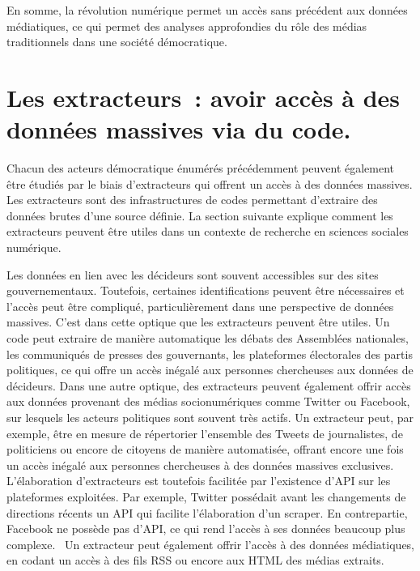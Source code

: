\documentclass[
  letterpaper,
]{scrbook}
\begin{document}
En somme, la révolution numérique permet un accès sans précédent aux
données médiatiques, ce qui permet des analyses approfondies du rôle des
médias traditionnels dans une société démocratique.

\hypertarget{les-extracteurs-avoir-accuxe8s-uxe0-des-donnuxe9es-massives-via-du-code.}{%
\section{\texorpdfstring{\textbf{Les extracteurs~: avoir accès à des
données massives via du
code.}}{Les extracteurs~: avoir accès à des données massives via du code.}}\label{les-extracteurs-avoir-accuxe8s-uxe0-des-donnuxe9es-massives-via-du-code.}}

Chacun des acteurs démocratique énumérés précédemment peuvent également
être étudiés par le biais d'extracteurs qui offrent un accès à des
données massives. Les extracteurs sont des infrastructures de codes
permettant d'extraire des données brutes d'une source définie. La
section suivante explique comment les extracteurs peuvent être utiles
dans un contexte de recherche en sciences sociales numérique.

Les données en lien avec les décideurs sont souvent accessibles sur des
sites gouvernementaux. Toutefois, certaines identifications peuvent être
nécessaires et l'accès peut être compliqué, particulièrement dans une
perspective de données massives. C'est dans cette optique que les
extracteurs peuvent être utiles. Un code peut extraire de manière
automatique les débats des Assemblées nationales, les communiqués de
presses des gouvernants, les plateformes électorales des partis
politiques, ce qui offre un accès inégalé aux personnes chercheuses aux
données de décideurs. Dans une autre optique, des extracteurs peuvent
également offrir accès aux données provenant des médias socionumériques
comme Twitter ou Facebook, sur lesquels les acteurs politiques sont
souvent très actifs. Un extracteur peut, par exemple, être en mesure de
répertorier l'ensemble des Tweets de journalistes, de politiciens ou
encore de citoyens de manière automatisée, offrant encore une fois un
accès inégalé aux personnes chercheuses à des données massives
exclusives. L'élaboration d'extracteurs est toutefois facilitée par
l'existence d'API sur les plateformes exploitées. Par exemple, Twitter
possédait avant les changements de directions récents un API qui
facilite l'élaboration d'un scraper. En contrepartie, Facebook ne
possède pas d'API, ce qui rend l'accès à ses données beaucoup plus
complexe. ~Un extracteur peut également offrir l'accès à des données
médiatiques, en codant un accès à des fils RSS ou encore aux HTML des
médias extraits.
\end{document}
